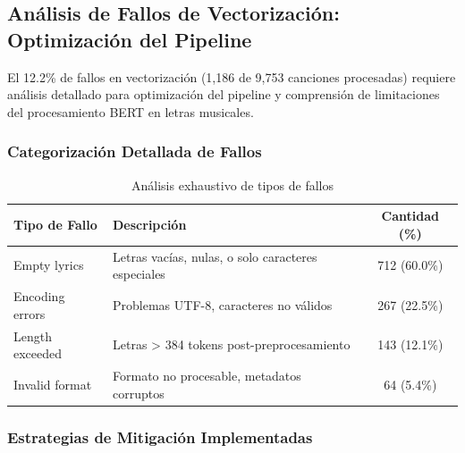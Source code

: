 \documentclass[12pt,a4paper]{article}
\begin{document}
\subsection{Análisis de Fallos de Vectorización: Optimización del Pipeline}

El 12.2\% de fallos en vectorización (1,186 de 9,753 canciones procesadas) requiere análisis detallado para optimización del pipeline y comprensión de limitaciones del procesamiento BERT en letras musicales.

\subsubsection{Categorización Detallada de Fallos}

\begin{table}[h]
\centering
\caption{Análisis exhaustivo de tipos de fallos}
\begin{tabular}{@{}llc@{}}
\toprule
\textbf{Tipo de Fallo} & \textbf{Descripción} & \textbf{Cantidad (\%)} \\
\midrule
Empty lyrics & Letras vacías, nulas, o solo caracteres especiales & 712 (60.0\%) \\
Encoding errors & Problemas UTF-8, caracteres no válidos & 267 (22.5\%) \\
Length exceeded & Letras > 384 tokens post-preprocesamiento & 143 (12.1\%) \\
Invalid format & Formato no procesable, metadatos corruptos & 64 (5.4\%) \\
\bottomrule
\end{tabular}
\end{table}

\subsubsection{Estrategias de Mitigación Implementadas}
\end{document}
